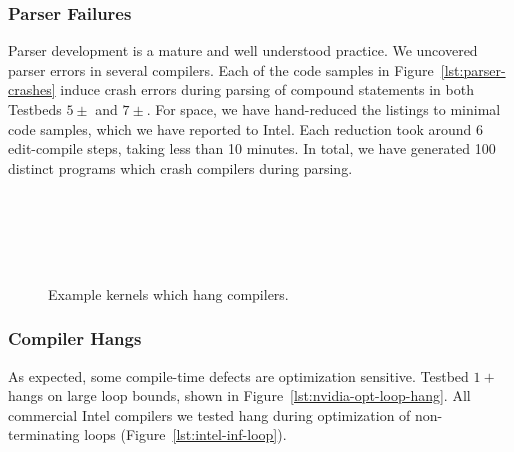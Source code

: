 \subsubsection{Parser Failures}

Parser development is a mature and well understood practice. We uncovered parser
errors in several compilers. Each of the code samples in
Figure~\ref{lst:parser-crashes} induce crash errors during parsing of compound
statements in both Testbeds $5\pm$ and $7\pm$. For space, we have hand-reduced
the listings to minimal code samples, which we have reported to Intel. Each
reduction took around 6 edit-compile steps, taking less than 10 minutes. In
total, we have generated 100 distinct programs which crash compilers during
parsing.

\begin{figure}
  \centering %
  \\%
  \\%
  \\%
  \\%
  \caption{Example kernels which hang compilers.}%
  \label{lst:compiler-hangs}
\end{figure}

\subsubsection{Compiler Hangs}

As expected, some compile-time defects are optimization sensitive. Testbed $1+$
hangs on large loop bounds, shown in Figure~\ref{lst:nvidia-opt-loop-hang}. All
commercial Intel compilers we tested hang during optimization of non-terminating
loops (Figure~\ref{lst:intel-inf-loop}).


